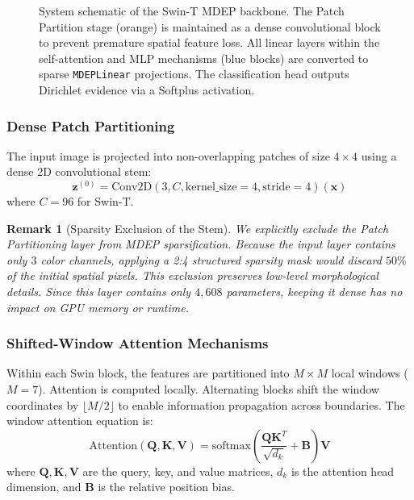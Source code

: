 \documentclass[11pt]{article}
\newtheorem{remark}{Remark}
\begin{document}
\begin{figure}[H]
\caption{System schematic of the Swin-T MDEP backbone. The Patch Partition stage (orange) is maintained as a dense convolutional block to prevent premature spatial feature loss. All linear layers within the self-attention and MLP mechanisms (blue blocks) are converted to sparse \texttt{MDEPLinear} projections. The classification head outputs Dirichlet evidence via a Softplus activation.}
\label{fig:swin_arch}
\end{figure}

\subsubsection{Dense Patch Partitioning}

The input image is projected into non-overlapping patches of size $4 \times 4$ using a dense 2D convolutional stem:
\begin{equation}\label{eq:patch_partition}
    \bm{z}^{(0)} = \text{Conv2D}(3, C, \text{kernel\_size}=4, \text{stride}=4)(\bm{x})
\end{equation}
where $C=96$ for Swin-T.

\begin{remark}[Sparsity Exclusion of the Stem]
We explicitly exclude the Patch Partitioning layer from MDEP sparsification. Because the input layer contains only $3$ color channels, applying a 2:4 structured sparsity mask would discard $50\%$ of the initial spatial pixels. This exclusion preserves low-level morphological details. Since this layer contains only $4{,}608$ parameters, keeping it dense has no impact on GPU memory or runtime.
\end{remark}

\subsubsection{Shifted-Window Attention Mechanisms}

Within each Swin block, the features are partitioned into $M \times M$ local windows ($M=7$). Attention is computed locally. Alternating blocks shift the window coordinates by $\lfloor M/2 \rfloor$ to enable information propagation across boundaries. The window attention equation is:
\begin{equation}\label{eq:attention}
    \text{Attention}(\bm{Q}, \bm{K}, \bm{V}) = \text{softmax}\!\left(\frac{\bm{Q}\bm{K}^T}{\sqrt{d_k}} + \bm{B}\right)\bm{V}
\end{equation}
where $\bm{Q}, \bm{K}, \bm{V}$ are the query, key, and value matrices, $d_k$ is the attention head dimension, and $\bm{B}$ is the relative position bias.
\end{document}
